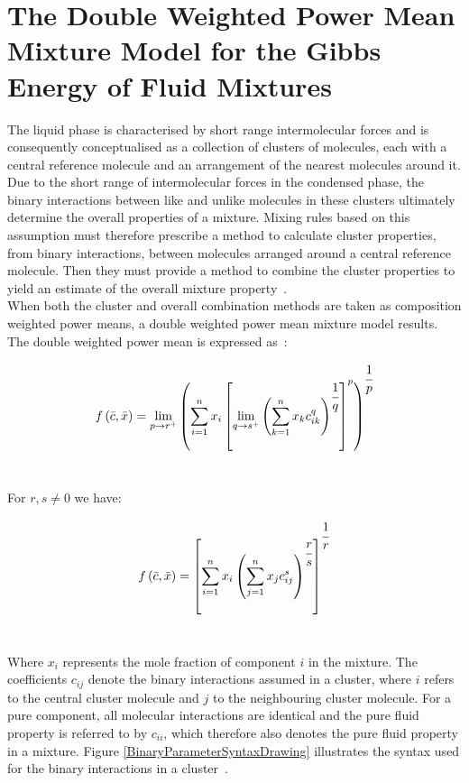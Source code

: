 \section{The Double Weighted Power Mean Mixture Model for the Gibbs Energy of Fluid Mixtures}

The liquid phase is characterised by short range intermolecular forces and is consequently conceptualised as a collection of clusters of molecules, each with a central reference molecule and an arrangement of the nearest molecules around it. Due to the short range of intermolecular forces in the condensed phase, the binary interactions between like and unlike molecules in these clusters ultimately determine the overall properties of a mixture. Mixing rules based on this assumption must therefore prescribe a method to calculate cluster properties, from binary interactions, between molecules arranged around a central reference molecule. Then they must provide a method to combine the cluster properties to yield an estimate of the overall mixture property~\cite{Maitland, WeightedPowerMeanModel, FockeSandrock}.\\

When both the cluster and overall combination methods are taken as composition weighted power means, a double weighted power mean mixture model results. The double weighted power mean is expressed as~\cite{WeightedPowerMeanModel, FockeSandrock}:\

\begin{equation}
  f\left( \bar{c}, \bar{x}\right) = \lim_{p \rightarrow r^{+}} \left( \sum_{i = 1}^{n} x_{i} \left[ \lim_{q \rightarrow s^{+}} \left(\sum_{k=1}^{n} x_{k} c_{ik}^{q} \right)^{\cfrac{1}{q}} \right]^{p} \right)^{\cfrac{1}{p}} \label{GeneralModelLimits}
\end{equation}\

For $r, s\neq 0$ we have:\

\begin{equation}
  f\left( \bar{c}, \bar{x}\right) = \left[\sum_{i=1}^{n} x_{i} \left(\sum_{j=1}^{n} x_{j}c_{ij}^{s}\right)^{\cfrac{r}{s}}\right]^{\cfrac{1}{r}} \label{GeneralModel}
\end{equation}\

Where $x_{i}$ represents the mole fraction of component $i$ in the mixture. The coefficients $c_{ij}$ denote the binary interactions assumed in a cluster, where $i$ refers to the central cluster molecule and $j$ to the neighbouring cluster molecule. For a pure component, all molecular interactions are identical and the pure fluid property is referred to by $c_{ii}$, which therefore also denotes the pure fluid property in a mixture. Figure \ref{BinaryParameterSyntaxDrawing} illustrates the syntax used for the binary interactions in a cluster~\cite{WeightedPowerMeanModel, FockeSandrock}.\\

